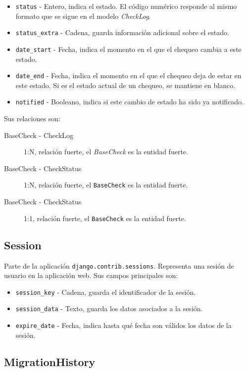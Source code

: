 \begin{itemize}
\item \texttt{status} - Entero, indica el estado. El código numérico responde al
  mismo formato que se sigue en el modelo \textit{CheckLog}.
\item \texttt{status\_extra} - Cadena, guarda información adicional sobre el estado.
\item \texttt{date\_start} - Fecha, indica el momento en el que el chequeo
  cambia a este estado.
\item \texttt{date\_end} - Fecha, indica el momento en el que el chequeo deja de
  estar en este estado. Si es el estado actual de un chequeo, se mantiene en blanco.
\item \texttt{notified} - Booleano, indica si este cambio de estado ha sido ya notificado.

\end{itemize}

Sus relaciones son:

\begin{description}
\item[BaseCheck - CheckLog] 1:N, relación fuerte, el \textit{BaseCheck} es la entidad fuerte.
\item[BaseCheck - CheckStatus] 1:N, relación fuerte, el \texttt{BaseCheck} es la entidad fuerte.
\item[BaseCheck - CheckStatus] 1:1, relación fuerte, el \texttt{BaseCheck} es la entidad fuerte. 
\end{description}

\subsection{Session}

Parte de la aplicación \texttt{django.contrib.sessions}. Representa una sesión
de usuario en la aplicación web. Sus campos principales son:

\begin{itemize}
\item \texttt{session\_key} - Cadena, guarda el identificador de la sesión.
\item \texttt{session\_data} - Texto, guarda los datos asociados a la sesión.
\item \texttt{expire\_date} - Fecha, indica hasta qué fecha son válidos los
  datos de la sesión.
\end{itemize}

\subsection{MigrationHistory}


